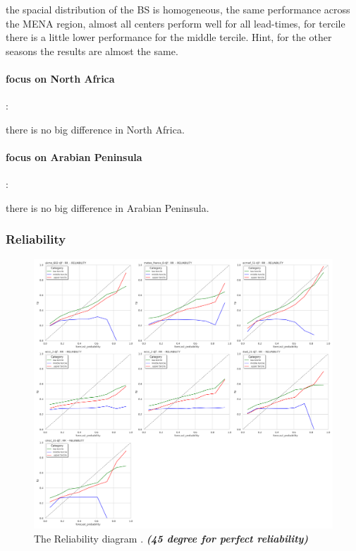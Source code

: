 the spacial distribution of the BS is homogeneous, the same performance across the MENA region, almost all centers perform well for all lead-times, for  tercile there is a little lower performance for the middle tercile.
Hint, for the other seasons the results are almost the same. 


\paragraph{focus on North Africa}:

there is no big difference in North Africa.
\vspace{1.5cm}
\paragraph{focus on Arabian Peninsula}:

there is no big difference in Arabian Peninsula.
\subsubsection{Reliability}

\begin{figure}[H]
    \centering
    \includegraphics[scale=0.25]{plots/prob/rela/rela_diagram_djf_RR.png}
    \caption{The Reliability diagram  . \textbf{\textit{(45 degree for perfect reliability)}}}
\end{figure}

